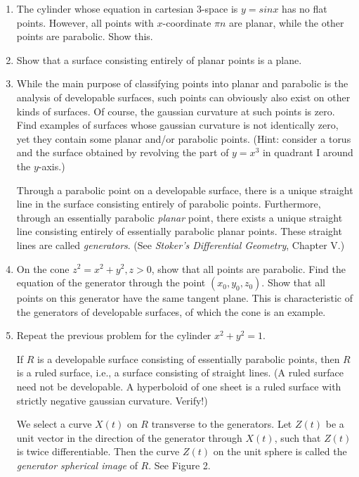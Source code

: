 \documentclass{book}
\begin{document}
\begin{enumerate}[1.]
  \item The cylinder whose equation in cartesian $3$-space is $y = sin x$ has no flat points. However, all points with $x$-coordinate $\pi n$ are planar, while the other points are parabolic. Show this.
  \item Show that a surface consisting entirely of planar points is a plane.
  \item While the main purpose of classifying points into planar and parabolic is the analysis of developable surfaces, such points can obviously also exist on other kinds of surfaces. Of course, the gaussian curvature at such points is zero. Find examples of surfaces whose gaussian curvature is not identically zero, yet they contain some planar and/or parabolic points. (Hint: consider a torus and the surface obtained by revolving the part of $y = x^{3}$ in quadrant I around the $y$-axis.)

      Through a parabolic point on a developable surface, there is a unique straight line in the surface consisting entirely of parabolic points. Furthermore, through an essentially parabolic \emph{planar} point, there exists a unique straight line consisting entirely of essentially parabolic planar points. These straight lines are called \emph{generators}. (See \emph{Stoker's Differential Geometry}, Chapter V.)
  \item On the cone $z^{2} = x^{2} + y^{2}, z > 0$, show that all points are parabolic. Find the equation of the generator through the point $(x_{0}, y_{0}, z_{0})$. Show that all points on this generator have the same tangent plane. This is characteristic of the generators of developable surfaces, of which the cone is an example.
  \item Repeat the previous problem for the cylinder $x^{2} + y^{2} = 1$.

      If $R$ is a developable surface consisting of essentially parabolic points, then $R$ is a ruled surface, i.e., a surface consisting of straight lines. (A ruled surface need not be developable. A hyperboloid of one sheet is a ruled surface with strictly negative gaussian curvature. Verify!)

      We select a curve $X(t)$ on $R$ transverse to the generators. Let $Z(t)$ be a unit vector in the direction of the generator through $X(t)$, such that $Z(t)$ is twice differentiable. Then the curve $Z(t)$ on the unit sphere is called the \emph{generator spherical image} of $R$. See Figure 2.
\end{enumerate}
\end{document}
